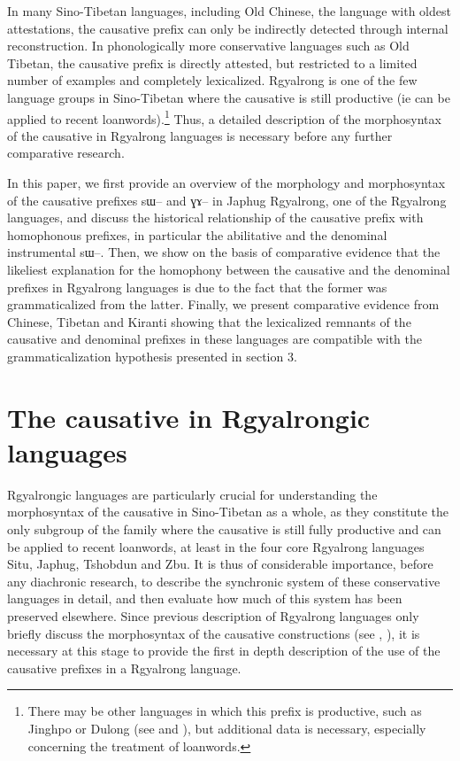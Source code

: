 \documentclass[oldfontcommands,oneside,a4paper,11pt]{article}
\newcommand{\ipa}[1]{{\phon \mbox{#1}}} %
\begin{document}
In many Sino-Tibetan languages, including Old Chinese, the  language with oldest attestations, the causative prefix can only be indirectly detected through internal reconstruction. In  phonologically more conservative languages such as Old Tibetan, the causative prefix is directly attested, but restricted to a limited number of examples and completely lexicalized. Rgyalrong is one of the few language groups in Sino-Tibetan where the causative is still productive (ie can be applied to recent loanwords).\footnote{There may be other languages in which this prefix is productive, such as Jinghpo or Dulong (see \citealt[71-8]{dai90yufa} and \citealt[101-2]{sunhk82dulong}), but additional data is necessary, especially concerning the treatment of loanwords.} Thus, a detailed description of the morphosyntax of the causative in Rgyalrong languages is necessary before any further comparative research.

In this paper, we first provide an overview of the morphology and morphosyntax of the causative prefixes \ipa{sɯ--} and \ipa{ɣɤ--} in Japhug Rgyalrong, one of the Rgyalrong languages, and discuss the historical relationship of the causative prefix with homophonous prefixes, in particular the abilitative and the denominal instrumental \ipa{sɯ--}. Then, we show on the basis of comparative evidence that the likeliest explanation for the homophony between the causative and the denominal prefixes in Rgyalrong languages is due to the fact that the former was grammaticalized from the latter.
Finally, we present comparative evidence from Chinese, Tibetan and Kiranti showing that the lexicalized remnants of the causative and denominal prefixes in these languages are compatible with the grammaticalization hypothesis presented in section 3.


\section{The causative in Rgyalrongic languages}


Rgyalrongic languages are particularly crucial for understanding the morphosyntax of the causative in Sino-Tibetan as a whole, as they constitute the only subgroup of the family where the causative is still fully productive and can be applied to recent loanwords, at least in the four core Rgyalrong languages Situ, Japhug, Tshobdun and Zbu. It is thus of considerable importance, before any diachronic research, to describe the synchronic system of these conservative languages in detail, and then evaluate how much of this system has been preserved elsewhere. Since previous description of Rgyalrong languages only briefly discuss the morphosyntax of the causative constructions (see \citealt{jackson06paisheng}, \citealt{jacques08zh}), it is necessary at this stage to provide the first in depth description of the use of the causative prefixes in a Rgyalrong language.
\end{document}
